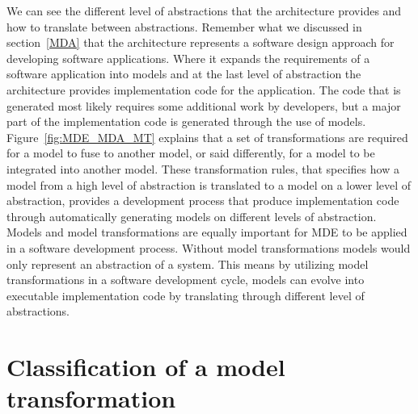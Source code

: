 We can see the different level of abstractions that the architecture provides
and how to translate between abstractions. Remember what we discussed in
section~\ref{MDA} that the architecture represents a software design approach
for developing software applications. Where it expands the requirements of
a software application into models and at the last level of abstraction the
architecture provides implementation code for the application. The code that is
generated most likely requires some additional work by developers, but a major
part of the implementation code is generated through the use of models.
Figure~\ref{fig:MDE_MDA_MT} explains that a set of transformations are required
for a model to fuse to another model, or said differently, for a model to be
integrated into another model. These transformation rules, that specifies how a model from
a high level of abstraction is translated to a model on a lower level of
abstraction, provides a development process that produce implementation code
through automatically generating models on different levels of abstraction.
Models and model transformations are equally important for MDE to be applied in
a software development process. Without model transformations models would only
represent an abstraction of a system. This means by utilizing model
transformations in a software development cycle, models can evolve into
executable implementation code by translating through different level of
abstractions. 




\section{Classification of a model transformation}

